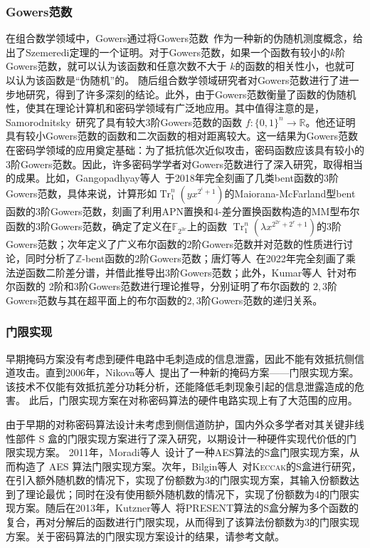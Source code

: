 \documentclass[a4paper,zihao=-4,AutoFakeBold]{ctexart}
\newcommand{\Tr}{\operatorname{Tr}_1^n}
\newcommand{\F}{\mathbb{F}}
\newcommand{\Z}{\mathbb{Z}}
\begin{document}
\subsubsection{Gowers范数}
在组合数学领域中，Gowers通过将Gowers范数~\cite{Gowers1998A}作为一种新的伪随机测度概念，给出了Szemeredi定理的一个证明。对于Gowers范数，如果一个函数有较小的$k$阶Gowers范数，就可以认为该函数和任意次数不大于 $k$的函数的相关性小，也就可以认为该函数是``伪随机''的。
随后组合数学领域研究者对Gowers范数进行了进一步地研究，得到了许多深刻的结论。此外，由于Gowers范数衡量了函数的伪随机性，使其在理论计算机和密码学领域有广泛地应用。其中值得注意的是，Samorodnitsky~\cite{SamSTOCy07}研究了具有较大$3$阶Gowers范数的函数 $f:\{0,1\}^n\to\mathbb{R}$。他还证明具有较小Gowers范数的函数和二次函数的相对距离较大。这一结果为Gowers范数在密码学领域的应用奠定基础：为了抵抗低次近似攻击，密码函数应该具有较小的$3$阶Gowers范数。因此，许多密码学学者对Gowers范数进行了深入研究，取得相当的成果。比如，Gangopadhyay等人~\cite{GMS18}于2018年完全刻画了几类bent函数的$3$阶Gowers范数，具体来说，计算形如$\Tr(yx^{2^i+1})$的Maiorana-McFarland型bent函数的$3$阶Gowers范数，刻画了利用APN置换和4-差分置换函数构造的MM型布尔函数的$3$阶Gowers范数，确定了定义在$\F_{2^{3r}}$上的函数 $\Tr(\lambda x^{2^{2r}+2^r+1})$的$3$阶Gowers范数；次年定义了广义布尔函数的$2$阶Gowers范数并对范数的性质进行讨论，同时分析了$\Z$-bent函数的$2$阶Gowers范数；唐灯等人~\cite{InverseFuncDAM2021}在2022年完全刻画了乘法逆函数二阶差分谱，并借此推导出$3$阶Gowers范数；此外，Kumar等人~\cite{KumarMG23u2u3}针对布尔函数的 $2$阶和$3$阶Gowers范数进行理论推导，分别证明了布尔函数的 $2,3$阶Gowers范数与其在超平面上的布尔函数的$2,3$阶Gowers范数的递归关系。

\subsubsection{门限实现}
早期掩码方案没有考虑到硬件电路中毛刺造成的信息泄露，因此不能有效抵抗侧信道攻击。直到2006年，Nikova等人~\cite{Nikova06TI}提出了一种新的掩码方案——门限实现方案。该技术不仅能有效抵抗差分功耗分析，还能降低毛刺现象引起的信息泄露造成的危害。
此后，门限实现方案在对称密码算法的硬件电路实现上有了大范围的应用。

由于早期的对称密码算法设计未考虑到侧信道防护，国内外众多学者对其关键非线性部件 S 盒的门限实现方案进行了深入研究，以期设计一种硬件实现代价低的门限实现方案。
2011年，Moradi等人~\cite{moradiPushingLimitsVery2011}设计了一种AES算法的S盒门限实现方案，从而构造了 AES 算法门限实现方案。次年，Bilgin等人~\cite{BilginCARDIS13}对\textsc{Keccak}的S盒进行研究，在引入额外随机数的情况下，实现了份额数为3的门限实现方案，其输入份额数达到了理论最优；同时在没有使用额外随机数的情况下，实现了份额数为4的门限实现方案。随后在2013年，Kutzner等人~\cite{kutzner13decomposeSbox_TI}将PRESENT算法的S盒分解为多个函数的复合，再对分解后的函数进行门限实现，从而得到了该算法份额数为$3$的门限实现方案。关于密码算法的门限实现方案设计的结果，请参考文献。
\end{document}
